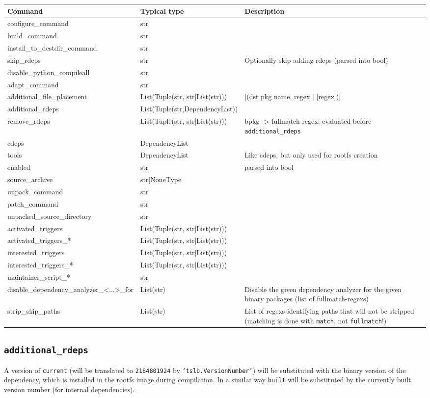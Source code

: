 \documentclass[a4paper]{scrartcl}
\newcommand{\python}[1]{\texttt{`#1'}}
\begin{document}
	\begin{tabularx}{\textwidth}{llX}
		Command & Typical type & Description \\
		\hline
		configure\_command & str & \\
		build\_command & str & \\
		install\_to\_destdir\_command & str & \\
		skip\_rdeps & str & Optionally skip adding rdeps (parsed into bool) \\
		disable\_python\_compileall & str & \\
		adapt\_command & str & \\
		additional\_file\_placement & List(Tuple(str, str|List(str))) & [(dst pkg name, regex | [regex])]\\
		additional\_rdeps & List(Tuple(str,DependencyList)) & \\
		remove\_rdeps & List(Tuple(str, str|List(str))) & bpkg -> fullmatch-regex; evaluated before \texttt{additional\_rdeps} \\
		cdeps & DependencyList & \\
		tools & DependencyList&  Like cdeps, but only used for rootfs creation \\
		enabled & str & parsed into bool \\
		source\_archive & str|NoneType & \\
		unpack\_command & str & \\
		patch\_command & str & \\
		unpacked\_source\_directory & str & \\
		activated\_triggers & List(Tuple(str, str|List(str))) & \\
		activated\_triggers\_* & List(Tuple(str, str|List(str))) & \\
		interested\_triggers & List(Tuple(str, str|List(str))) & \\
		interested\_triggers\_* & List(Tuple(str, str|List(str))) & \\
		maintainer\_script\_* & str & \\
		disable\_dependency\_analyzer\_<...>\_for & List(str) & Disable the given dependency analyzer for the given binary packages (list of fullmatch-regexs) \\
		strip\_skip\_paths & List(str) & List of regexs identifying paths that will not be stripped (matching is done with \texttt{match}, not \texttt{fullmatch}!) \\
	\end{tabularx}

	\subsection{\texttt{additional\_rdeps}}
	\label{sec:additional_rdeps}
	
	A version of \texttt{current} (will be translated to \texttt{2184801924} by \python{tslb.VersionNumber}) will be substituted with the binary version of the dependency, which is installed in the rootfs image during compilation. In a similar way \texttt{built} will be substituted by the currently built version number (for internal dependencies).
	
\end{document}
